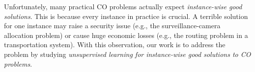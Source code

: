 Unfortunately, many practical CO problems actually expect \emph{instance-wise good solutions}. This is because every instance in practice is crucial. A terrible solution for one instance may raise a security issue (e.g., the surveillance-camera allocation problem) or cause huge economic losses (e.g., the routing problem in a transportation system). With this observation, our work is to address the problem by studying \emph{unsupervised learning for instance-wise good solutions to CO problems}.












